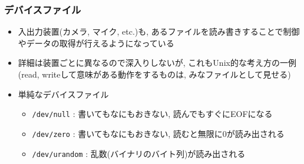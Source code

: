 \documentclass[12pt,dvipdfmx]{beamer}
\begin{document}
\begin{frame}[fragile]
  \frametitle{デバイスファイル}
  \begin{itemize}
  \item 入出力装置(カメラ, マイク, etc.)も,
    あるファイルを読み書きすることで制御やデータの取得が行えるようになっている
  \item 詳細は装置ごとに異なるので深入りしないが,
    これもUnix的な考え方の一例(read, writeして意味がある動作をするものは,
    みなファイルとして見せる)
  \item 単純なデバイスファイル
    \begin{itemize}
    \item {\tt /dev/null} : 書いてもなにもおきない, 読んでもすぐにEOFになる
    \item {\tt /dev/zero} : 書いてもなにもおきない, 読むと無限に0が読み出される
    \item {\tt /dev/urandom} : 乱数(バイナリのバイト列)が読み出される 
    \end{itemize}
  \end{itemize}
\end{frame}
\end{document}
